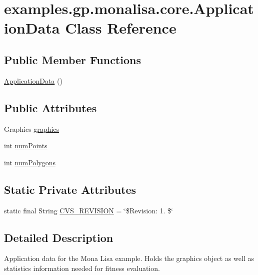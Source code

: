 \hypertarget{classexamples_1_1gp_1_1monalisa_1_1core_1_1_application_data}{\section{examples.\-gp.\-monalisa.\-core.\-Application\-Data Class Reference}
\label{classexamples_1_1gp_1_1monalisa_1_1core_1_1_application_data}
}
\subsection*{Public Member Functions}
\begin{DoxyCompactItemize}
\item 
\hyperlink{classexamples_1_1gp_1_1monalisa_1_1core_1_1_application_data_a51ebf7eb9268c413a4f8ac11fea8e09d}{Application\-Data} ()
\end{DoxyCompactItemize}
\subsection*{Public Attributes}
\begin{DoxyCompactItemize}
\item 
Graphics \hyperlink{classexamples_1_1gp_1_1monalisa_1_1core_1_1_application_data_a8103dc38fc502b0a0cff2133d9ef6589}{graphics}
\item 
int \hyperlink{classexamples_1_1gp_1_1monalisa_1_1core_1_1_application_data_a63022fe46d08350e26c59b7a284f47c7}{num\-Points}
\item 
int \hyperlink{classexamples_1_1gp_1_1monalisa_1_1core_1_1_application_data_ada7916857f89dc2406284c927dfacc8d}{num\-Polygons}
\end{DoxyCompactItemize}
\subsection*{Static Private Attributes}
\begin{DoxyCompactItemize}
\item 
static final String \hyperlink{classexamples_1_1gp_1_1monalisa_1_1core_1_1_application_data_abb2db60e0fc579d0b21f4cd492c5fec5}{C\-V\-S\-\_\-\-R\-E\-V\-I\-S\-I\-O\-N} = \char`\"{}\$Revision\-: 1. \$\char`\"{}
\end{DoxyCompactItemize}


\subsection{Detailed Description}
Application data for the Mona Lisa example. Holds the graphics object as well as statistics information needed for fitness evaluation.

